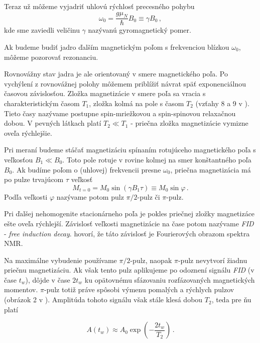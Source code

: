 \documentclass[a4paper, 10pt]{article}
\begin{document}
Teraz už môžeme vyjadriť uhlovú rýchlosť precesného pohybu 
\begin{equation}
\label{eq:teor:uhlova_rychost}
\omega_0 = \frac{g\mu_N}{\hbar} B_0\equiv \gamma B_0\,,
\end{equation}
kde sme zaviedli veličinu $\gamma$ nazývanú gyromagnetický pomer.

Ak budeme budiť jadro ďalším magnetickým poľom s frekvenciou blízkou $\omega_0$, môžeme pozorovať rezonanciu.

Rovnovážny stav jadra je ale orientovaný v smere magnetického poľa. Po vychýlení z rovnovážnej polohy môžemem priblížiť návrat späť exponenciálnou časovou závislosťou. Zložka magnetizácie v smere poľa sa vracia s charakteristickým časom $T_1$, zložka kolmá na pole s časom $T_2$ (vzťahy 8 a 9 v \cite{stud}). Tieto časy nazývame postupne spin-mriežkovou a spin-spinovou relaxačnou dobou. V pevných látkach platí $T_2 \ll T_1$ - priečna zložka magnetizácie vymizne oveľa rýchlejšie.

Pri meraní budeme stáčať magnetizáciu spínaním rotujúceho magnetického poľa s veľkosťou $B_1 \ll B_0$. Toto pole rotuje v rovine kolmej na smer konštantného poľa $B_0$. Ak budíme poľom o (uhlovej) frekvencii presne $\omega_0$, priečna magnetizácia má po pulze trvajúcom $\tau$ veľkosť
\begin{equation}
\label{eq:teor:priecna_magnetizacia}
M_{t = 0} = M_0 \sin (\gamma B_1 \tau) \equiv M_0 \sin \varphi\,.
\end{equation}
Podľa veľkosti $\varphi$ nazývame potom pulz $\pi/2$-pulz či $\pi$-pulz.

Pri ďalšej nehomogenite stacionárneho poľa je pokles priečnej zložky magnetizáce ešte oveľa rýchlejší. Závislosť veľkosti magnetizácie na čase potom nazývame \textit{FID} - \textit{free induction decay}. \cite{stud} hovorí, že táto závislosť je Fourierových obrazom spektra NMR. 

Na maximálne vybudenie používame $\pi/2$-pulz, naopak $\pi$-pulz nevytvorí žiadnu priečnu magnetizáciu. Ak však tento pulz aplikujeme po odoznení signálu \textit{FID} (v čase $t_w$), dôjde v čase $2t_w$ ku opätovnému sfázovaniu rozfázovaných magnetických momentov. $\pi$-pulz totiž práve spôsobi výmenu pomalých a rýchlych pulzov (obrázok 2 v \cite{stud}). Amplitúda tohoto signálu však stále klesá dobou $T_2$, teda pre ňu platí

\begin{equation}
\label{eq:teor:amplituda}
A(t_{w}) \approx A_0 \exp\left(-\frac{2t_w}{T_2}\right)\,.
\end{equation}
 
\end{document}
